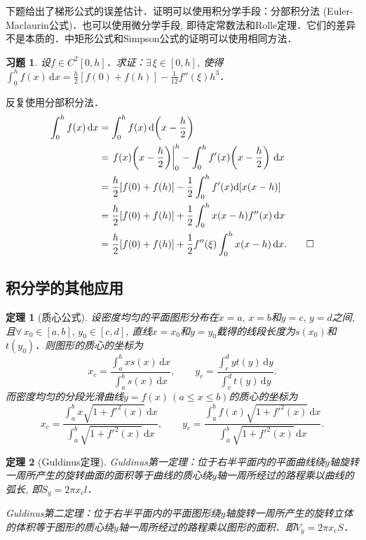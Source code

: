 \documentclass[11pt,a4paper]{ctexart}
\makeatletter
\theoremstyle{thmseries} %
\newtheorem{thm}{定理}[section]
\theoremstyle{exerseries}
\newtheorem{exer}{习题}[section]
\renewenvironment{proof}[1][\proofname]{\par
  \pushQED{\qed}%
  \normalfont \topsep6\p@\@plus6\p@\relax
  \trivlist
  \item[\hskip\labelsep
        \itshape
    #1\@addpunct{}]\ignorespaces
}{%
  \popQED\endtrivlist\@endpefalse
}
\newenvironment{pf}{\begin{proof}[\bfseries\upshape 证\quad]}{\end{proof}}
\newcommand{\bra}[1]{\mathopen{}\left(#1\right)}
\renewcommand{\d}{\mathrm{d}}
\makeatother
\begin{document}
下题给出了梯形公式的误差估计．证明可以使用积分学手段：分部积分法 (Euler-Maclaurin公式)．也可以使用微分学手段, 即待定常数法和Rolle定理．它们的差异不是本质的．中矩形公式和Simpson公式的证明可以使用相同方法．
\begin{exer}
	设$f\in C^2[0,h]$．求证：$\exists\,\xi\in[0,h]$, 使得$\int_{0}^{h}f(x)\,\d x=\frac{h}{2}[f(0)+f(h)]-\frac{1}{12}f''(\xi)h^3$．
\end{exer}
\begin{pf}
	反复使用分部积分法．
	\begin{align*}
		\int_{0}^{h}f(x)\,\d x&=\int_{0}^{h}f(x)\,\d\bra{x-\frac{h}{2}}\\
		&=\left.f(x)\bra{x-\frac{h}{2}}\right|_0^h-\int_{0}^{h}f'(x)\bra{x-\frac{h}{2}}\,\d x\\
		&=\frac{h}{2}[f(0)+f(h)]-\frac{1}{2}\int_{0}^{h}f'(x)\d[x(x-h)]\\
		&=\frac{h}{2}[f(0)+f(h)]+\frac{1}{2}\int_{0}^{h}x(x-h)f''(x)\,\d x\\
		&=\frac{h}{2}[f(0)+f(h)]+\frac{1}{2}f''(\xi)\int_{0}^{h}x(x-h)\,\d x.\qedhere
	\end{align*}
\end{pf}


\subsection{积分学的其他应用}
\begin{thm}[质心公式]
	设密度均匀的平面图形分布在$x=a,\,x=b$和$y=c,\,y=d$之间, 且$\forall\,x_0\in[a,b],\,y_0\in[c,d]$, 直线$x=x_0$和$y=y_0$截得的线段长度为$s(x_0)$和$t(y_0)$．则图形的质心的坐标为
	\[x_c=\frac{\int_{a}^{b}xs(x)\,\d x}{\int_{a}^{b}s(x)\,\d x},\qquad y_c=\frac{\int_{c}^{d}yt(y)\,\d y}{\int_{c}^{d}t(y)\,\d y}.\]
	而密度均匀的分段光滑曲线$y=f(x)\,(a\leq x\leq b)$的质心的坐标为
	\[x_c=\frac{\int_{a}^{b}x\sqrt{1+f'^2(x)}\,\d x}{\int_{a}^{b}\sqrt{1+f'^2(x)}\,\d x},\qquad y_c=\frac{\int_{a}^{b}f(x)\sqrt{1+f'^2(x)}\,\d x}{\int_{a}^{b}\sqrt{1+f'^2(x)}\,\d x}.\]
\end{thm}

\begin{thm}[Guldinus定理]
	\phantom{text}

	Guldinus第一定理：位于右半平面内的平面曲线绕$y$轴旋转一周所产生的旋转曲面的面积等于曲线的质心绕$y$轴一周所经过的路程乘以曲线的弧长, 即$S_y=2\pi x_cl$．

	Guldinus第二定理：位于右半平面内的平面图形绕$y$轴旋转一周所产生的旋转立体的体积等于图形的质心绕$y$轴一周所经过的路程乘以图形的面积．即$V_y=2\pi x_cS$．
\end{thm}
\end{document}
